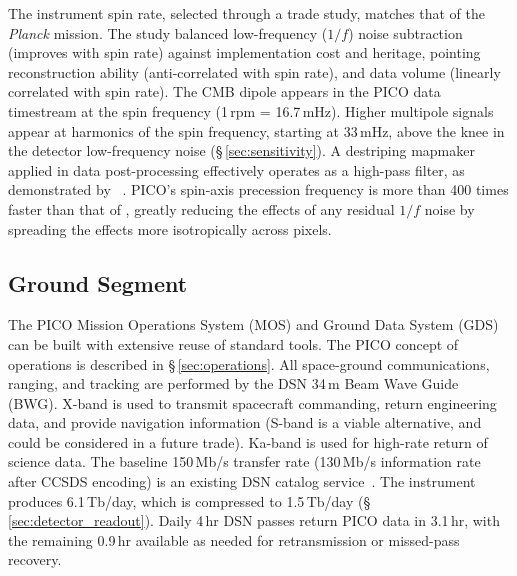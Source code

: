 The instrument spin rate, selected through a trade study, matches that
of the \textit{Planck} mission. The study balanced low-frequency
($1/f$) noise subtraction (improves with spin rate) against
implementation cost and heritage, pointing reconstruction ability
(anti-correlated with spin rate), and data volume (linearly correlated
with spin rate).  The CMB dipole appears in the PICO data timestream
at the spin frequency (1\,rpm = 16.7\,mHz). Higher multipole signals
appear at harmonics of the spin frequency, starting at 33\,mHz, above
the knee in the detector low-frequency noise (\S\,\ref{sec:sensitivity}). A destriping mapmaker applied in data
post-processing effectively operates as a high-pass filter, as
demonstrated by \planck~\citep{Kurki-Suonio2009}. PICO's spin-axis precession frequency is 
more than 400 times faster than that of \planck , greatly reducing the effects of any residual $1/f$
noise by spreading the effects more isotropically across pixels.

\subsection{Ground Segment}
\label{sec:ground_segment} %

The PICO Mission Operations System (MOS) and Ground Data System (GDS)
can be built with extensive reuse of standard tools. The PICO concept
of operations is described in \S\,\ref{sec:operations}.
All space-ground communications, ranging, and tracking are performed
by the DSN 34\,m Beam Wave Guide (BWG). X-band is
used to transmit spacecraft commanding, return engineering data, and
provide navigation information (S-band is a viable alternative, and
could be considered in a future trade). Ka-band is used for high-rate
return of science data.  The baseline 150\,Mb/s transfer rate
(130\,Mb/s information rate after CCSDS encoding) is an existing DSN
catalog service~\citep{DSN2015}.  The instrument produces 6.1\,Tb/day,
which is compressed to 1.5\,Tb/day
(\S\,\ref{sec:detector_readout}). Daily 4\,hr DSN passes return PICO
data in 3.1\,hr, with the remaining 0.9\,hr available as needed for
retransmission or missed-pass recovery.


